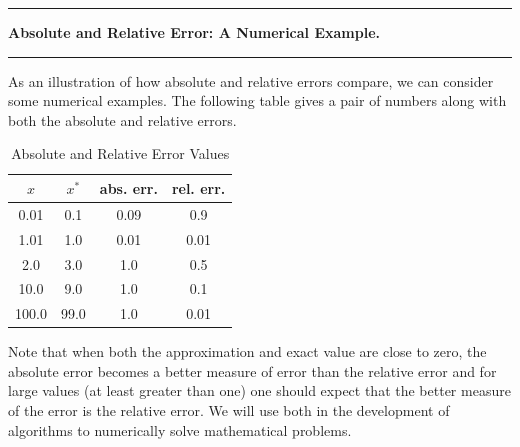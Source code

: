 \documentclass[10pt,fleqn]{article}
\begin{document}
\vskip0.1in\hrule\vskip0.1in
\noindent
{\bf Absolute and Relative Error: A Numerical Example.} 
\vskip0.1in\hrule\vskip0.1in
\noindent
As an illustration of how absolute and relative errors compare, we can consider
some numerical examples. The following table gives a pair of numbers along with
both the absolute and relative errors.

\begin{table}[h!]
   \caption{Absolute and Relative Error Values}
   \begin{center}
   \begin{tabular}{c|c|c|c}
     \hline
     \textbf{$x$} & \textbf{$x^*$} & \textbf{abs. err.} & \textbf{rel. err.} \\
     \hline
     0.01 & 0.1 & 0.09 & 0.9 \\
     \hline
     1.01 & 1.0 & 0.01 & 0.01 \\
     \hline
     2.0   & 3.0  & 1.0 & 0.5 \\
     \hline
     10.0  & 9.0  & 1.0 & 0.1 \\
     \hline
     100.0 & 99.0 & 1.0 & 0.01 \\
     \hline
   \end{tabular}
   \end{center}
\end{table}

Note that when both the approximation and exact value are close to zero, the
absolute error becomes a better measure of error than the relative error and
for large values (at least greater than one) one should expect that the better
measure of the error is the relative error. We will use both in the development
of algorithms to numerically solve mathematical problems.
\end{document}
